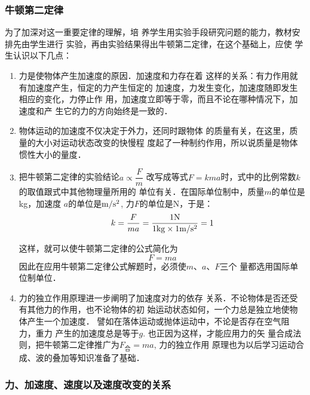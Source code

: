 \subsubsection{牛顿第二定律}

为了加深对这一重要定律的理解，培
养学生用实验手段研究问题的能力，教材安排先由学生进行
实验，再由实验结果得出牛顿第二定律，在这个基础上，应使
学生认识以下几点：
\begin{enumerate}
    \item 力是使物体产生加速度的原因．加速度和力存在着
这样的关系：有力作用就有加速度产生，恒定的力产生恒定的
加速度，力发生变化，加速度随即发生相应的变化，力停止作
用，加速度立即等于零，而且不论在哪种情况下，加速度和产
生它的力的方向始终是一致的．
\item 物体运动的加速度不仅决定于外力，还同时跟物体
的质量有关，在这里，质量的大小对运动状态改变的快慢程
度起了一种制约作用，所以说质量是物体惯性大小的量度．
\item 把牛顿第二定律的实验结论$a\propto \dfrac{F}{m}$
改写成等式$F=kma$时，式中的比例常数$k$的取值跟式中其他物理量所用的
单位有关．在国际单位制中，质量$m$的单位是kg，加速度
$a$的单位是${\rm m/s^2}$, 力$F$的单位是N，于是：
\[k=\frac{F}{ma}=\frac{1{\rm N}}{1{\rm kg}\times 1{\rm m/s^2}}=1\]

这样，就可以使牛顿第二定律的公式简化为
\[F=ma\]
因此在应用牛顿第二定律公式解题时，必须使$m$、$a$、$F$三个
量都选用国际单位制单位．

\item 力的独立作用原理进一步阐明了加速度对力的依存
关系．不论物体是否还受有其他力的作用，也不论物体的初
始运动状态如何，一个力总是独立地使物体产生一个加速度．
譬如在落体运动或抛体运动中，不论是否存在空气阻力，重力
产生的加速度总是等于$g$. 也正因为这样，才能应用力的矢
量合成法则，把牛顿第二定律推广为$F_{\text{合}}=ma$, 力的独立作用
原理也为以后学习运动合成、波的叠加等知识准备了基础．
\end{enumerate}

\subsubsection{力、加速度、速度以及速度改变的关系}

